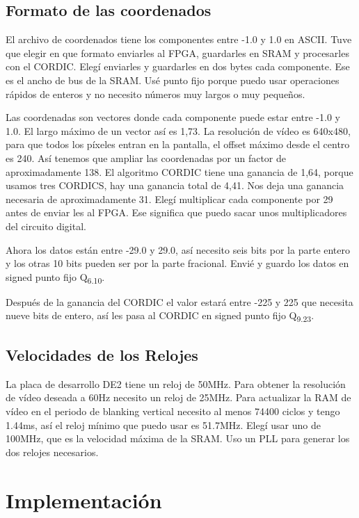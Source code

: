 \documentclass[a4paper]{article}
\begin{document}
\subsection{Formato de las coordenados}

El archivo de coordenados tiene los componentes entre -1.0 y 1.0 en ASCII. Tuve que elegir en que formato enviarles al FPGA, guardarles en SRAM y procesarles con el CORDIC. Elegí enviarles y guardarles en dos bytes cada componente. Ese es el ancho de bus de la SRAM. Usé punto fijo porque puedo usar operaciones rápidos de enteros y no necesito números muy largos o muy pequeños.

Las coordenadas son vectores donde cada componente puede estar entre -1.0 y 1.0. El largo máximo de un vector así es 1,73. La resolución de vídeo es 640x480, para que todos los píxeles entran en la pantalla, el offset máximo desde el centro es 240. Así tenemos que ampliar las coordenadas por un factor de aproximadamente 138. El algoritmo CORDIC tiene una ganancia de 1,64, porque usamos tres CORDICS, hay una ganancia total de 4,41. Nos deja una ganancia necesaria de aproximadamente 31. Elegí multiplicar cada componente por 29 antes de enviar les al FPGA. Ese significa que puedo sacar unos multiplicadores del circuito digital.

Ahora los datos están entre -29.0 y 29.0, así necesito seis bits por la parte entero y los otras 10 bits pueden ser por la parte fracional. Envié y guardo los datos en signed punto fijo Q\textsubscript{6.10}.

Después de la ganancia del CORDIC el valor estará entre -225 y 225 que necesita nueve bits de entero, así les pasa al CORDIC en signed punto fijo Q\textsubscript{9.23}.

\subsection{Velocidades de los Relojes}

La placa de desarrollo DE2 tiene un reloj de 50MHz. Para obtener la resolución de vídeo deseada a 60Hz necesito un reloj de 25MHz. Para actualizar la RAM de vídeo en el periodo de blanking vertical necesito al menos 74400 ciclos y tengo 1.44ms, así el reloj mínimo que puedo usar es 51.7MHz. Elegí usar uno de 100MHz, que es la velocidad máxima de la SRAM. Uso un PLL para generar los dos relojes necesarios.

\section{Implementación}
\end{document}

